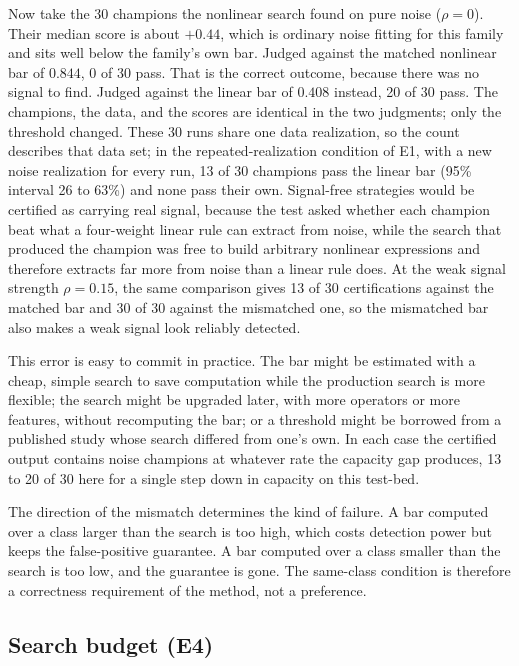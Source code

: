 \documentclass[11pt]{article}
\begin{document}
Now take the 30 champions the nonlinear search found on pure noise ($\rho=0$). Their median score is
about $+0.44$, which is ordinary noise fitting for this family and sits well below the family's own bar.
Judged against the matched nonlinear bar of $0.844$, 0 of 30 pass. That is the
correct outcome, because there was no signal to find. Judged against the linear bar of $0.408$ instead,
20 of 30 pass. The champions, the data, and the scores are identical in the two judgments; only the
threshold changed. These 30 runs share one data realization, so the count describes that data set; in
the repeated-realization condition of E1, with a new noise realization for every run, 13 of 30 champions
pass the linear bar (95\% interval 26 to 63\%) and none pass their own. Signal-free strategies would be
certified as carrying real signal, because the test asked whether each champion beat what a four-weight linear rule
can extract from noise, while the search that produced the champion was free to build arbitrary
nonlinear expressions and therefore extracts far more from noise than a linear rule does. At the weak signal
strength $\rho=0.15$, the same comparison gives 13 of 30 certifications against the matched bar and 30
of 30 against the mismatched one, so the mismatched bar also makes a weak signal look reliably
detected.

This error is easy to commit in practice. The bar might be estimated with a cheap, simple search to save
computation while the production search is more flexible; the search might be upgraded later, with more
operators or more features, without recomputing the bar; or a threshold might be borrowed from a
published study whose search differed from one's own. In each case the certified output contains noise
champions at whatever rate the capacity gap produces, 13 to 20 of 30 here for a single step down in
capacity on this test-bed.

The direction of the mismatch determines the kind of failure. A bar computed over a class larger than
the search is too high, which costs detection power but keeps the false-positive guarantee. A bar
computed over a class smaller than the search is too low, and the guarantee is gone. The same-class
condition is therefore a correctness requirement of the method, not a preference.

\subsection{Search budget (E4)}
\label{sec:e4}
\end{document}
